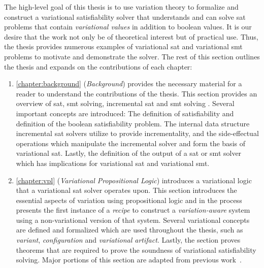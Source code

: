 \label{section:contributions}
%
The high-level goal of this thesis is to use variation theory to formalize and
construct a variational satisfiability solver that understands and can solve
\ac{sat} problems that contain \emph{variational values} in addition to boolean
values. It is our desire that the work not only be of theoretical interest but
of practical use. Thus, the thesis provides numerous examples of variational
\ac{sat} and variational \ac{smt} problems to motivate and demonstrate the
solver. The rest of this section outlines the thesis and expands on the
contributions of each chapter:

  \begin{enumerate}
  \item \autoref{chapter:background} (\emph{Background}) provides the necessary
    material for a reader to understand the contributions of the thesis. This
    section provides an overview of \acl{sat}, \acl{smt} solving, incremental
    \ac{sat} and \ac{smt} solving . Several important concepts are introduced:
    The definition of satisfiability and definition of the boolean
    satisfiability problem. The internal data structure incremental \ac{sat}
    solvers utilize to provide incrementality, and the side-effectual operations
    which manipulate the incremental solver and form the basis of variational
    \acl{sat}. Lastly, the definition of the output of a \ac{sat} or \ac{smt}
    solver which has implications for variational \acl{sat} and variational
    \ac{smt}.

  \item \autoref{chapter:vpl} (\emph{Variational Propositional Logic})
    introduces a variational logic that a variational \ac{sat} solver operates
    upon. This section introduces the essential aspects of variation using
    propositional logic and in the process presents the first instance of a
    \emph{\recipe{} recipe} to construct a \emph{variation-aware} system using a
    non-variational version of that system. Several variational concepts are
    defined and formalized which are used throughout the thesis, such as
    \emph{variant}, \emph{configuration} and \emph{variational artifact}.
    Lastly, the section proves theorems that are required to prove the soundness
    of variational satisfiability solving. Major portions of this section are
    adapted from previous work~\cite{YWT:SPLC20}.


\end{enumerate}

